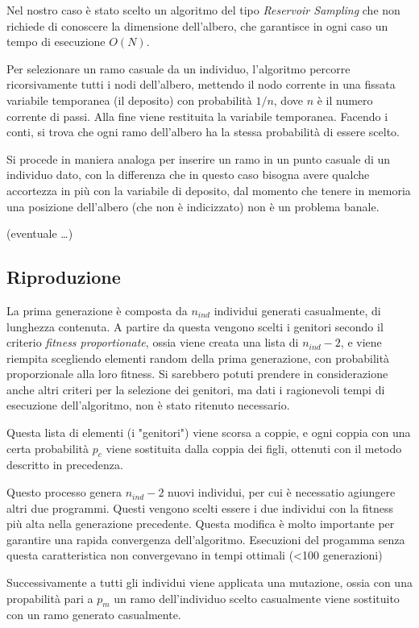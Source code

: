 \documentclass[paper=a4, fontsize=11pt]{scrartcl}
\numberwithin{equation}{section}		%
\numberwithin{figure}{section}			%
\numberwithin{table}{section}				%
\begin{document}
Nel nostro caso è stato scelto un algoritmo del tipo \emph{Reservoir Sampling} che non richiede di conoscere la dimensione dell'albero, che garantisce in ogni caso un tempo di esecuzione $O(N)$.

Per selezionare un ramo casuale da un individuo, l'algoritmo percorre ricorsivamente tutti i nodi  dell'albero, mettendo il nodo corrente in una fissata variabile temporanea (il deposito) con probabilità $1/n$, dove $n$ è il numero corrente di passi. Alla fine viene restituita la variabile temporanea. Facendo i conti, si trova che ogni ramo dell'albero ha la stessa probabilità di essere scelto.

Si procede in maniera analoga per inserire un ramo in un punto casuale di un individuo dato, con la differenza che in questo caso bisogna avere qualche accortezza in più con la variabile di deposito, dal momento che tenere in memoria una posizione dell'albero (che non è indicizzato) non è un problema banale.

(eventuale \dots)


\subsection{Riproduzione}

La prima generazione è composta da $n_{ind}$ individui generati casualmente, di lunghezza contenuta. A partire da questa vengono scelti i genitori secondo il criterio \emph{fitness proportionate}, ossia viene creata una lista di $n_{ind} -2$, e viene riempita scegliendo elementi random della prima generazione, con probabilità proporzionale  alla loro fitness. 
Si sarebbero potuti prendere in considerazione anche altri criteri per la selezione dei genitori, ma dati i ragionevoli tempi di esecuzione dell'algoritmo, non è stato ritenuto necessario.

Questa lista di elementi (i "genitori") viene scorsa a coppie, e ogni coppia con una certa probabilità $p_c$  viene sostituita dalla coppia dei figli, ottenuti con il metodo descritto in precedenza. 

Questo processo genera $n_{ind}-2$ nuovi individui, per cui è necessatio agiungere altri due programmi. Questi vengono scelti essere i due individui con la fitness più alta nella generazione precedente.  Questa  modifica è molto importante per garantire una rapida convergenza dell'algoritmo. Esecuzioni del progamma senza questa caratteristica non convergevano in tempi ottimali (<100 generazioni)

Successivamente a tutti gli individui viene applicata una mutazione, ossia con una propabilità pari a $p_m$ un ramo dell'individuo scelto casualmente viene sostituito con un ramo generato casualmente.
\end{document}
